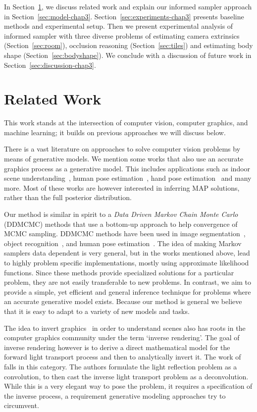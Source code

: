 In Section~\ref{sec:related-chap3},
we discuss related work and explain our informed
sampler approach in Section~\ref{sec:model-chap3}.
Section~\ref{sec:experiments-chap3} presents baseline methods
and experimental setup. Then we present experimental analysis of
informed sampler with three diverse
problems of estimating camera extrinsics (Section~\ref{sec:room}),
occlusion reasoning (Section~\ref{sec:tiles}) and estimating body shape (Section~\ref{sec:bodyshape}).
We conclude with a discussion of future work in Section~\ref{sec:discussion-chap3}.


\section{Related Work}
\label{sec:related-chap3}

This work stands at the intersection of computer vision, computer
graphics, and machine learning; it builds on previous approaches we
will discuss below.

There is a vast literature on approaches to solve computer vision
problems by means of generative models. We mention some works that
also use an accurate graphics process as a generative model. This
includes applications such as indoor scene
understanding~\cite{del2012bayesian}, human pose
estimation~\cite{lee2004proposal}, hand pose
estimation~\cite{de2008model} and many more. Most of these works are
however interested in inferring MAP solutions, rather than the full
posterior distribution.

Our method is similar in spirit to a \emph{Data Driven
Markov Chain Monte Carlo} (DDMCMC) methods that use a bottom-up
approach to help convergence of MCMC sampling. DDMCMC methods have
been used in image segmentation~\cite{tu2002image}, object
recognition~\cite{zhu2000integrating}, and human pose
estimation~\cite{lee2004proposal}. The idea of making Markov samplers
data dependent is very general, but in the works mentioned above,
lead to highly problem specific implementations, mostly using
approximate likelihood functions. Since these methods provide specialized
solutions for a particular problem, they are not easily transferable to
new problems.
In contrast, we aim to provide a simple,
yet efficient and general inference technique for problems where an accurate
generative model exists.
Because our method is general we believe that it is easy to adapt to a variety
of new models and tasks.

The idea to invert graphics~\cite{baumgart1974inversegraphics} in order to
understand scenes also has roots in the computer graphics community under the term
`inverse rendering'. The goal of inverse rendering however is to
derive a direct mathematical model for the forward light transport
process and then to analytically invert it. The work
of~\cite{ramamoorthi2001signal} falls in this category. The authors
formulate the light reflection problem as a convolution, to then
cast the inverse light transport problem as a deconvolution.
While this is a very elegant way to pose the problem, it requires
a specification of the inverse process, a requirement generative
modeling approaches try to circumvent.

